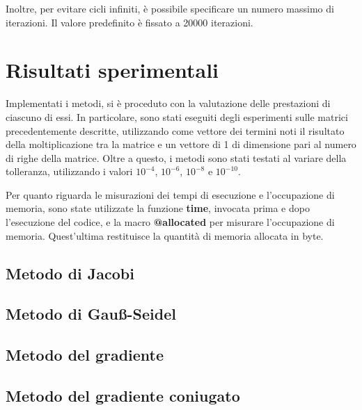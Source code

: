 Inoltre, per evitare cicli infiniti, è possibile specificare un numero massimo
di iterazioni. Il valore predefinito è fissato a 20000 iterazioni.

\section{Risultati sperimentali}
Implementati i metodi, si è proceduto con la valutazione delle prestazioni di
ciascuno di essi. In particolare, sono stati eseguiti degli esperimenti sulle
matrici precedentemente descritte, utilizzando come vettore dei termini noti il
risultato della moltiplicazione tra la matrice e un vettore di 1 di dimensione
pari al numero di righe della matrice. Oltre a questo, i metodi sono stati testati
al variare della tolleranza, utilizzando i valori $10^{-4}$, $10^{-6}$, $10^{-8}$
e $10^{-10}$.

Per quanto riguarda le misurazioni dei tempi di esecuzione e l'occupazione di
memoria, sono state utilizzate la funzione \textbf{time}, invocata prima e dopo
l'esecuzione del codice, e la macro \textbf{@allocated} per misurare l'occupazione
di memoria. Quest'ultima restituisce la quantità di memoria allocata in byte.


\subsection{Metodo di Jacobi}
\subsection{Metodo di Gauß-Seidel}
\subsection{Metodo del gradiente}
\subsection{Metodo del gradiente coniugato}